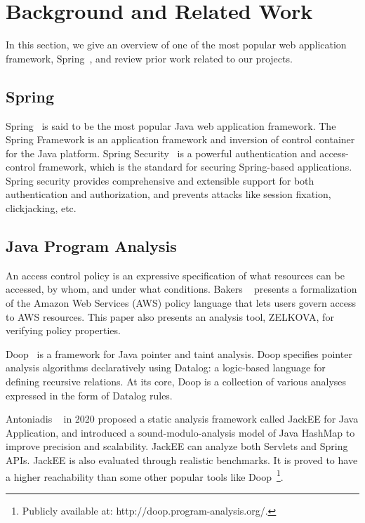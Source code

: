 \section{Background and Related Work} %
In this section, we give an overview of one of the most popular web application
framework, Spring~\cite{spring+security:home}, and review prior work related to
our projects.

\subsection{Spring}

Spring~\cite{spring+security:home} is said to be the most popular Java web
application framework.
%
The Spring Framework is an application framework and inversion of control
container for the Java platform.
%
Spring Security~\cite{spring+security:method} is a powerful authentication and
access-control framework, which is the standard for securing Spring-based
applications.
%
Spring security provides comprehensive and extensible support for both
authentication and authorization, and prevents attacks like session fixation,
clickjacking, etc.

\subsection{Java Program Analysis}

An access control policy is an expressive specification of what resources can be accessed, by whom, and under what conditions. Bakers \etal~\cite{Backes+etal:2018:Zelkova} presents a formalization of the Amazon Web Services (AWS) policy language  that lets users govern access to AWS resources. This paper also presents an analysis tool, ZELKOVA, for verifying policy properties.

Doop~\cite{Bravenboer:2009:Doop} is a framework for Java pointer and taint
analysis.
%
Doop specifies pointer analysis algorithms declaratively using Datalog: a
logic-based language for defining recursive relations.
%
At its core, Doop is a collection of various analyses expressed in the form of
Datalog rules.

Antoniadis \etal~\cite{Antoniadis+etal:2020:Java} in 2020 proposed a static
analysis framework called JackEE for Java Application, and introduced a
sound-modulo-analysis model of Java HashMap to improve precision and
scalability. JackEE can analyze both Servlets and Spring APIs. JackEE is also
evaluated through realistic benchmarks. It is proved to have a higher
reachability than some other popular tools like Doop~\footnote{Publicly
  available at: http://doop.program-analysis.org/.}.
  
